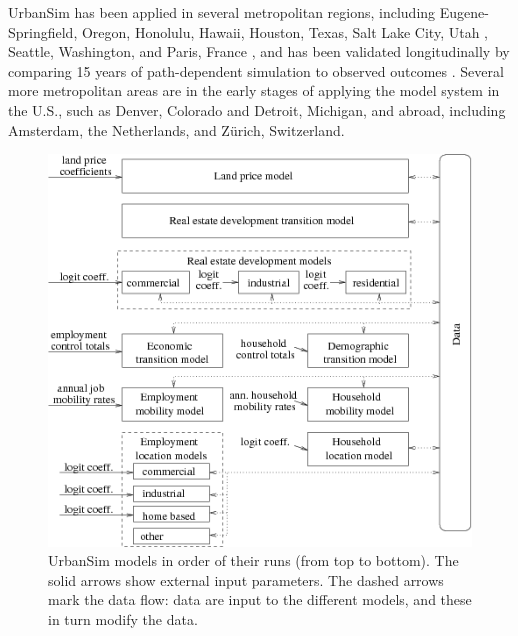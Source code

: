 \documentclass[12pt,a4paper]{article}
\begin{document}
UrbanSim has been applied in several metropolitan regions,
including Eugene-Springfield, Oregon, Honolulu, Hawaii, Houston,
Texas, Salt Lake City, Utah \cite{waddell-tra-2007}, Seattle, 
Washington, and Paris, France \cite{depalma-jue-2007}, and has been
validated longitudinally by comparing 15 years of path-dependent
simulation to observed outcomes 
\cite{waddell-japa-2002,sevcikova-trb-2007}.  Several
more metropolitan areas are in the early stages of applying the
model system in the U.S., such as Denver, Colorado and Detroit,
Michigan, and abroad, including Amsterdam, the Netherlands, 
 and Z\"{u}rich, Switzerland.

\begin{figure}[t]
\begin{center}
\includegraphics[scale=0.8]{UrbanSim_with_par.png}
\caption{\label{fig:urbansim} \small UrbanSim models in order of
their runs
  (from top to bottom). The solid arrows show external input parameters. The
  dashed arrows mark the data flow: data are input to the different models,
  and these in turn modify the data.}
\end{center}
\end{figure}
\end{document}
